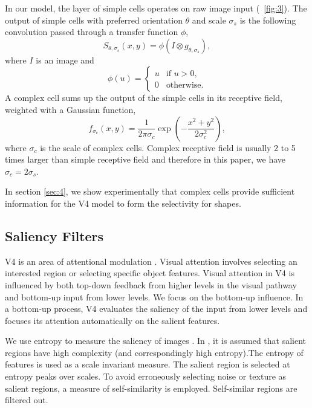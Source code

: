 \documentclass[conference]{IEEEtran}
\begin{document}
In our model, the layer of simple cells operates on raw image input
(\figurename~\ref{fig:3}). 
The output of simple cells with preferred orientation $\theta$
and scale $\sigma_s$ is the following convolution
passed through a transfer function $\phi$,
\begin{equation}\label{equ:gabor}
S_{\theta,\sigma_s}(x,y)=\phi(I\otimes g_{\theta,\sigma_s}),
\end{equation}
where $I$ is an image and 
\begin{equation}\label{equ:gabor}
\phi(u)=\left\{\begin{array}{ll}
u & \text{if } u>0,\\
0 & \text{otherwise.}
\end{array}\right.
\end{equation}
A complex cell sums up the output of the simple cells in its receptive field, 
weighted with a Gaussian function,
\begin{equation}
f_{\sigma_c}(x,y)=\frac{1}{2\pi\sigma_c}\exp\left(-\frac{x^2+y^2}{2\sigma_c^2}\right),
\end{equation}
where $\sigma_c$ is the scale of complex cells.
Complex receptive field is usually 2 to 5 times larger than simple receptive field \cite{movshon1978}
and therefore in this paper, we have $\sigma_c=2\sigma_s$.

In section \ref{sec:4},
we show experimentally that complex cells provide sufficient information 
for the V4 model to form the selectivity for shapes.

\subsection{Saliency Filters}

V4 is an area of attentional modulation \cite{roe2012}.
Visual attention involves selecting an interested region or selecting specific object features.
Visual attention in V4 is influenced by both top-down feedback from higher levels in the visual pathway
and bottom-up input from lower levels.
We focus on the bottom-up influence.
In a bottom-up process, V4 evaluates the saliency of the input from lower levels
and focuses its attention automatically on the salient features.

We use entropy to measure the saliency of images \cite{kadir2001}.
In \cite{kadir2001}, it is assumed that salient regions have high complexity (and correspondingly high entropy).The entropy of features is used as a scale invariant measure.
The salient region is selected at entropy peaks over scales.
To avoid erroneously selecting noise or texture as salient regions,
a measure of self-similarity is employed.
Self-similar regions are filtered out.
\end{document}
